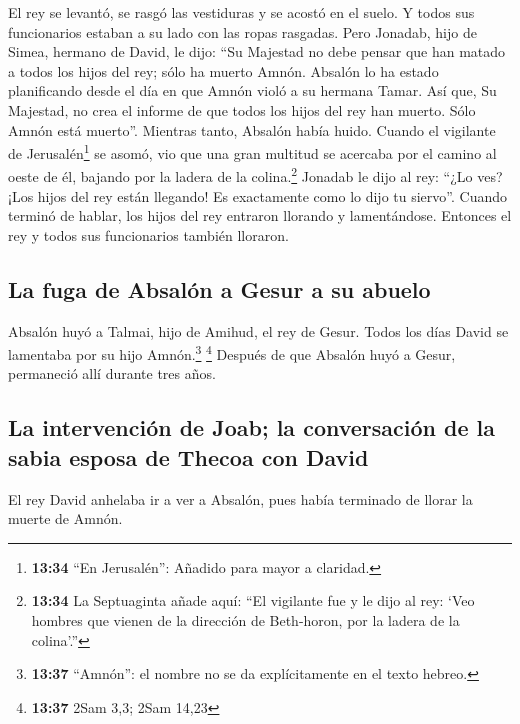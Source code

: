  El rey se levantó, se rasgó las vestiduras y se acostó
en el suelo. Y todos sus funcionarios estaban a su lado con las ropas
rasgadas.  Pero Jonadab, hijo de Simea, hermano de David,
le dijo: ``Su Majestad no debe pensar que han matado a todos los hijos
del rey; sólo ha muerto Amnón. Absalón lo ha estado planificando desde
el día en que Amnón violó a su hermana Tamar.  Así que,
Su Majestad, no crea el informe de que todos los hijos del rey han
muerto. Sólo Amnón está muerto''.  Mientras tanto,
Absalón había huido. Cuando el vigilante de Jerusalén\footnote{\textbf{13:34}
  ``En Jerusalén'': Añadido para mayor a claridad.} se asomó, vio que
una gran multitud se acercaba por el camino al oeste de él, bajando por
la ladera de la colina.\footnote{\textbf{13:34} La Septuaginta añade
  aquí: ``El vigilante fue y le dijo al rey: `Veo hombres que vienen de
  la dirección de Beth-horon, por la ladera de la colina'.''}
 Jonadab le dijo al rey: ``¿Lo ves? ¡Los hijos del rey
están llegando! Es exactamente como lo dijo tu siervo''. 
Cuando terminó de hablar, los hijos del rey entraron llorando y
lamentándose. Entonces el rey y todos sus funcionarios también lloraron.

\hypertarget{la-fuga-de-absaluxf3n-a-gesur-a-su-abuelo}{%
\subsection{La fuga de Absalón a Gesur a su
abuelo}\label{la-fuga-de-absaluxf3n-a-gesur-a-su-abuelo}}

 Absalón huyó a Talmai, hijo de Amihud, el rey de Gesur.
Todos los días David se lamentaba por su hijo Amnón.\footnote{\textbf{13:37}
  ``Amnón'': el nombre no se da explícitamente en el texto hebreo.}
\footnote{\textbf{13:37} 2Sam 3,3; 2Sam 14,23}  Después
de que Absalón huyó a Gesur, permaneció allí durante tres años.

\hypertarget{la-intervenciuxf3n-de-joab-la-conversaciuxf3n-de-la-sabia-esposa-de-thecoa-con-david}{%
\subsection{La intervención de Joab; la conversación de la sabia esposa
de Thecoa con
David}\label{la-intervenciuxf3n-de-joab-la-conversaciuxf3n-de-la-sabia-esposa-de-thecoa-con-david}}

 El rey David anhelaba ir a ver a Absalón, pues había
terminado de llorar la muerte de Amnón.

